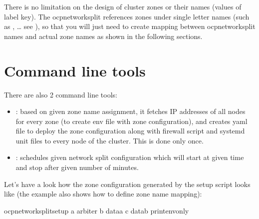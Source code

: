 \documentclass[letterpaper,10pt,english]{sphinxmanual}
\begin{document}
There is no limitation on the design of cluster zones or their names
(values of  label key). The ocp\sphinxhyphen{}network\sphinxhyphen{}split
references zones under single letter names (such as ,  … see
{\hyperref[\detokenize{ocpnetsplit:ocpnetsplit.zone.ZONES}]{}}), so that you will just need to
create mapping between ocp\sphinxhyphen{}network\sphinxhyphen{}split names and actual zone names as shown
in the following sections.


\section{Command line tools}
\label{\detokenize{usage:command-line-tools}}
There are also 2 command line tools:
\begin{itemize}
\item {} 
: based on given zone name assignment, it fetches
IP addresses of all nodes for every zone (to create env file with zone
configuration), and creates  yaml file to deploy the zone
configuration along with firewall script and systemd unit files to every node
of the cluster. This is done only once.

\item {} 
: schedules given network split configuration
which will start at given time and stop after given number of minutes.

\end{itemize}

Let’s have a look how the zone configuration generated by the setup script
looks like (the example also shows how to define zone name mapping):

\begin{sphinxVerbatim}[commandchars=\\\{\}]
 ocp\PYGZhy{}network\PYGZhy{}split\PYGZhy{}setup \PYGZhy{}a arbiter \PYGZhy{}b data\PYGZhy{}a \PYGZhy{}c data\PYGZhy{}b \PYGZhy{}\PYGZhy{}print\PYGZhy{}env\PYGZhy{}only
\end{sphinxVerbatim}
\end{document}
